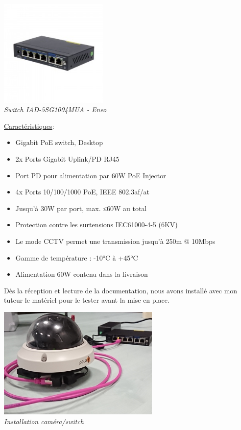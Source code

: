 \documentclass[12pt, french]{report}
\begin{document}
\begin{center}
    \includegraphics[width=0.4\textwidth]{Dimensionnement/SWPOE.jpg}\\
    \textit{Switch IAD-5SG1004MUA - Eneo}\\
\end{center}
\underline{Caractéristiques}:
\begin{itemize}
    \item[\bullet] Gigabit PoE switch, Desktop
    \item[\bullet] 2x Ports Gigabit Uplink/PD RJ45
    \item[\bullet] Port PD pour alimentation par 60W PoE Injector
    \item[\bullet] 4x Ports 10/100/1000 PoE, IEEE 802.3af/at
    \item[\bullet] Jusqu'à 30W par port, max. ≤60W au total
    \item[\bullet] Protection contre les surtensions IEC61000-4-5 (6KV)
    \item[\bullet] Le mode CCTV permet une transmission jusqu'à 250m @ 10Mbps
    \item[\bullet] Gamme de température : -10°C à +45°C
    \item[\bullet] Alimentation 60W contenu dans la livraison
\end{itemize}
Dès la réception et lecture de la documentation, nous avons installé avec mon tuteur le matériel pour le tester avant la mise en place.
\begin{center}
    \includegraphics[width=0.6\textwidth]{Dimensionnement/camsw.png}\\
    \textit{Installation caméra/switch}\\
\end{center}
\end{document}
